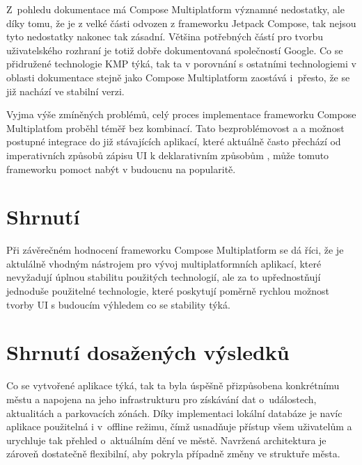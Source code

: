 

Z~pohledu dokumentace má Compose Multiplatform významné nedostatky, ale díky tomu, že je z velké části odvozen z frameworku Jetpack Compose,
tak nejsou tyto nedostatky nakonec tak zásadní. Většina potřebných částí pro tvorbu uživatelského rozhraní je totiž dobře dokumentovaná 
společností Google. Co se přidružené technologie KMP týká, tak ta v porovnání s ostatními technologiemi v oblasti dokumentace stejně jako Compose 
Multiplatform zaostává i~přesto, že se již nachází ve stabilní verzi.

Vyjma výše zmíněných problémů, celý proces implementace frameworku Compose Multiplatfom proběhl téměř bez kombinací. Tato bezproblémovost a 
a možnost postupné integrace do již stávajících aplikací, které aktuálně často přechází od imperativních způsobů zápisu UI k deklarativním způsobům \cite{declarativeUIHistory},
může tomuto frameworku pomoct nabýt v budoucnu na popularitě. 

\section*{Shrnutí}
Při závěrečném hodnocení frameworku Compose Multiplatform se dá říci, že je aktulálně vhodným nástrojem pro vývoj multiplatformních 
aplikací, které nevyžadují úplnou stabilitu použitých technologií, ale za to upřednostňují jednoduše použitelné technologie, které 
poskytují poměrně rychlou možnost tvorby UI s budoucím výhledem co se stability týká.


\section{Shrnutí dosažených výsledků}
Co se vytvořené aplikace týká, tak ta byla úspěšně přizpůsobena konkrétnímu městu a napojena na jeho infrastrukturu pro získávání dat 
o~událostech, aktualitách a parkovacích zónách. Díky implementaci lokální databáze je navíc aplikace použitelná i v~offline režimu, čímž 
usnadňuje přístup všem uživatelům a urychluje tak přehled o~aktuálním dění ve městě. Navržená architektura je zároveň dostatečně flexibilní, 
aby pokryla případně změny ve struktuře města.

